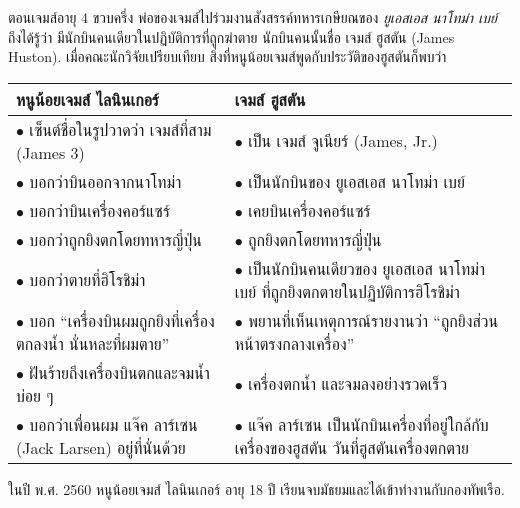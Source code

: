 {\begin{shaded}
		ตอนเจมส์อายุ 4 ขวบครึ่ง พ่อของเจมส์ไปร่วมงานสังสรรค์ทหารเกษียณของ \textit{ยูเอสเอส นาโทม่า เบย์}
		ถึงได้รู้ว่า มีนักบินคนเดียวในปฏิบัติการที่ถูกฆ่าตาย 
		นักบินคนนั้นชื่อ เจมส์ ฮูสตัน (James Huston).
		เมื่อคณะนักวิจัยเปรียบเทียบ
		สิ่งที่หนูน้อยเจมส์พูดกับประวัติของฮูสตันก็พบว่า
		
		\begin{tabular}{ >{\arraybackslash}p{2.8in} | >{\arraybackslash}p{2.8in} }
			หนูน้อยเจมส์ ไลนินเกอร์ & เจมส์ ฮูสตัน \\
			\hline
			$\bullet$ เซ็นต์ชื่อในรูปวาดว่า เจมส์ที่สาม (James 3) & $\bullet$ เป็น เจมส์ จูเนียร์ (James, Jr.) \\
			$\bullet$ บอกว่าบินออกจากนาโทม่า &  $\bullet$ เป็นนักบินของ ยูเอสเอส นาโทม่า เบย์ \\
			$\bullet$ บอกว่าบินเครื่องคอร์แซร์ & $\bullet$ เคยบินเครื่องคอร์แซร์ \\
			$\bullet$ บอกว่าถูกยิงตกโดยทหารญี่ปุ่น & $\bullet$ ถูกยิงตกโดยทหารญี่ปุ่น \\
			$\bullet$ บอกว่าตายที่ฮิโรชิม่า & $\bullet$ เป็นนักบินคนเดียวของ ยูเอสเอส นาโทม่า เบย์ ที่ถูกยิงตกตายในปฏิบัติการฮิโรชิม่า \\
			$\bullet$ บอก ``เครื่องบินผมถูกยิงที่เครื่อง ตกลงน้ำ นั่นหละที่ผมตาย'' 
			& $\bullet$ พยานที่เห็นเหตุการณ์รายงานว่า ``ถูกยิงส่วนหน้าตรงกลางเครื่อง'' 
			\\
			$\bullet$ ฝันร้ายถึงเครื่องบินตกและจมน้ำบ่อย ๆ & $\bullet$ เครื่องตกน้ำ และจมลงอย่างรวดเร็ว \\
			$\bullet$ บอกว่าเพื่อนผม แจ๊ค ลาร์เซน (Jack Larsen) อยู่ที่นั่นด้วย
			& $\bullet$ แจ๊ค ลาร์เซน เป็นนักบินเครื่องที่อยู่ใกล้กับเครื่องของฮูสตัน วันที่ฮูสตันเครื่องตกตาย \\
			\hline
		\end{tabular} 
		\vspace{0.5cm}
		
		ในปี พ.ศ. 2560 หนูน้อยเจมส์ ไลนินเกอร์ อายุ 18 ปี เรียนจบมัธยมและได้เข้าทำงานกับกองทัพเรือ.
		


\end{shaded}}
